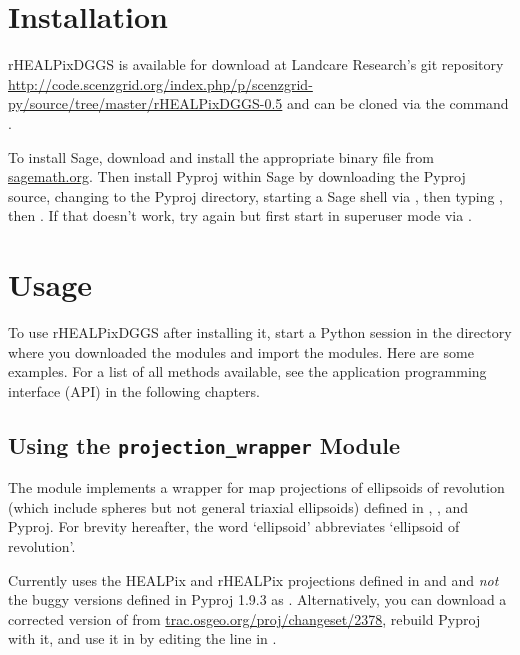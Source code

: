 \documentclass[a4paper,12ptopenany,oneside]{sphinxmanual}
\begin{document}
\section{Installation}
\label{introduction:installation}
rHEALPixDGGS is available for download at Landcare Research's git repository \href{http://code.scenzgrid.org/index.php/p/scenzgrid-py/source/tree/master/rHEALPixDGGS-0.5}{http://code.scenzgrid.org/index.php/p/scenzgrid-py/source/tree/master/rHEALPixDGGS-0.5} and can be cloned via the command .

To install Sage, download and install the appropriate binary file from \href{http://www.sagemath.org}{sagemath.org}.
Then install Pyproj within Sage by downloading the Pyproj source, changing to the Pyproj directory, starting a Sage shell via , then typing , then .
If that doesn't work, try again but first start in superuser mode via .


\section{Usage}
\label{introduction:usage}
To use rHEALPixDGGS after installing it, start a Python session in the directory where you downloaded the modules and import the modules.
Here are some examples.
For a list of all methods available, see the application programming interface (API) in the following chapters.


\subsection{Using the \texttt{projection\_wrapper} Module}
\label{introduction:using-the-projection-wrapper-module}
The module  implements a wrapper for map projections of ellipsoids of revolution (which include spheres but not general triaxial ellipsoids) defined in , , and Pyproj.
For brevity hereafter, the word `ellipsoid' abbreviates `ellipsoid of revolution'.

Currently  uses the HEALPix and rHEALPix projections
defined in  and  and \emph{not} the buggy versions  defined in Pyproj 1.9.3 as .
Alternatively, you can download a corrected version of  from
\href{http://trac.osgeo.org/proj/changeset/2378}{trac.osgeo.org/proj/changeset/2378}, rebuild Pyproj with it, and use it in  by editing the  line in .
\end{document}
